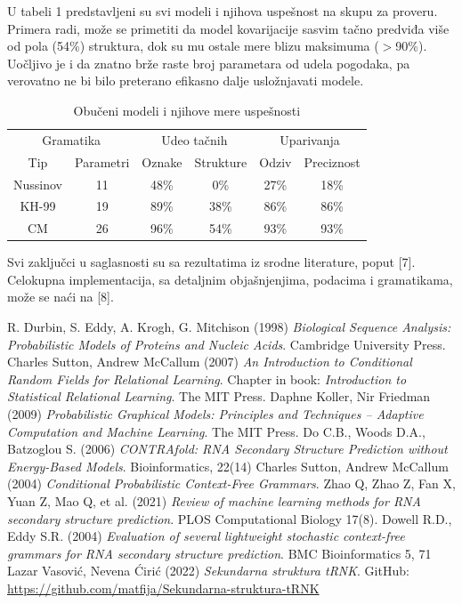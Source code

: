 \documentclass[a4paper, 12pt]{article}
\begin{document}
U tabeli 1 predstavljeni su svi modeli i njihova uspešnost na skupu za proveru. Primera radi, može se primetiti da model kovarijacije sasvim tačno predviđa više od pola (54\%) struktura, dok su mu ostale mere blizu maksimuma ($>$90\%). Uočljivo je i da znatno brže raste broj parametara od udela pogodaka, pa verovatno ne bi bilo preterano efikasno dalje usložnjavati modele.

\begin{table}[h!]
    \centering
    \caption{Obučeni modeli i njihove mere uspešnosti}
    \begin{tabular}{c c | c c | c c}
        \multicolumn{2}{c}{Gramatika} & \multicolumn{2}{|c|}{Udeo tačnih} & \multicolumn{2}{c}{Uparivanja} \\
        Tip & Parametri & Oznake & Strukture & Odziv & Preciznost \\ \hline
        Nussinov & 11 & 48\% & 0\% & 27\% & 18\% \\
        KH-99 & 19 & 89\% & 38\% & 86\% & 86\% \\
        CM & 26 & 96\% & 54\% & 93\% & 93\%
  \end{tabular}
\end{table}

Svi zaključci u saglasnosti su sa rezultatima iz srodne literature, poput [7]. Celokupna implementacija, sa detaljnim objašnjenjima, podacima i gramatikama, može se naći na [8].

\newpage 

\begin{thebibliography}{9}
\bibitem{} R. Durbin, S. Eddy, A. Krogh, G. Mitchison (1998) \textit{Biological Sequence Analysis: Probabilistic Models of Proteins and Nucleic Acids}. Cambridge University Press.
\bibitem{} Charles Sutton, Andrew McCallum (2007) \textit{An Introduction to Conditional Random Fields for Relational Learning}. Chapter in book: \textit{Introduction to Statistical Relational Learning}. The MIT Press.
\bibitem{} Daphne Koller, Nir Friedman (2009) \textit{Probabilistic Graphical Models: Principles and Techniques -- Adaptive Computation and Machine Learning}. The MIT Press.
\bibitem{} Do C.B., Woods D.A., Batzoglou S. (2006) \textit{CONTRAfold: RNA Secondary Structure Prediction without Energy-Based Models}. Bioinformatics, 22(14)
\bibitem{} Charles Sutton, Andrew McCallum (2004) \textit{Conditional Probabilistic Context-Free Grammars}.
\bibitem{} Zhao Q, Zhao Z, Fan X, Yuan Z, Mao Q, et al. (2021) \textit{Review of machine learning methods for RNA secondary structure prediction}. PLOS Computational Biology 17(8).
\bibitem{} Dowell R.D., Eddy S.R. (2004) \textit{Evaluation of several lightweight stochastic context-free grammars for RNA secondary structure prediction}. BMC Bioinformatics 5, 71
\bibitem{} Lazar Vasović, Nevena Ćirić (2022) \textit{Sekundarna struktura tRNK}. GitHub: \url{https://github.com/matfija/Sekundarna-struktura-tRNK}
\end{thebibliography}
\end{document}
